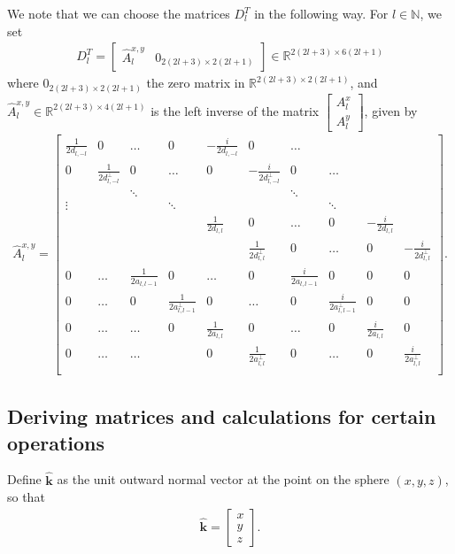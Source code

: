 \documentclass[11pt, oneside]{article}   	%
\newcommand{\R}{\mathbb{R}}
\newcommand{\N}{\mathbb{N}}
\newcommand{\Dlt}{D^T_l}
\newcommand{\unitvec}{\hat{\bm{k}}}
\begin{document}
We note that we can choose the matrices \(\Dlt\) in the following way. For \(l \in \N\), we set
\begin{align}
\Dlt = \begin{bmatrix}
		\hat{A}^{x,y}_l & 0_{2(2l+3)\times2(2l+1)}
	  \end{bmatrix} \in \R^{2(2l+3)\times6(2l+1)}
\end{align}
where \(0_{2(2l+3)\times2(2l+1)}\) the zero matrix in \(\R^{2(2l+3)\times2(2l+1)}\), and \(\hat{A}^{x,y}_l \in \R^{2(2l+3)\times4(2l+1)}\) is the left inverse of the matrix \(\begin{bmatrix} A^x_l \\ A^y_l \end{bmatrix}\), given by
\begin{align}
\hat{A}^{x,y}_l = \begin{bmatrix}
		\frac{1}{2d_{l,-l}} & 0 & \hdots & 0 & -\frac{i}{2d_{l,-l}} & 0 & \hdots &  \\
		0 & \frac{1}{2d^\perp_{l,-l}} & 0 & \hdots & 0 & -\frac{i}{2d^\perp_{l,-l}} & 0 & \hdots &  \\
		& & \ddots & & & & \ddots & & \\
		\vdots & & & \ddots & & & & \ddots & \\
		& & & & \frac{1}{2d_{l,l}} & 0 & \hdots & 0 & -\frac{i}{2d_{l,l}} & \\
		& & & & & \frac{1}{2d^\perp_{l,l}} & 0 & \hdots & 0 & -\frac{i}{2d^\perp_{l,l}} \\
		0 & \hdots & \frac{1}{2a_{l,l-1}} & 0 & \hdots & 0 & \frac{i}{2a_{l,l-1}} & 0 & 0 & 0 \\
		0 & \hdots & 0 & \frac{1}{2a^\perp_{l,l-1}} & 0 & \hdots & 0 & \frac{i}{2a^\perp_{l,l-1}} & 0 & 0\\
		0 & \hdots & \hdots & 0 & \frac{1}{2a_{l,l}} & 0 & \hdots & 0 & \frac{i}{2a_{l,l}} & 0 \\
		0 & \hdots & \hdots & & 0 & \frac{1}{2a^\perp_{l,l}} & 0 & \hdots & 0 & \frac{i}{2a^\perp_{l,l}} \\
	  \end{bmatrix}.
\end{align}



\subsection{Deriving matrices and calculations for certain operations}

Define \(\unitvec\) as the unit outward normal vector at the point on the sphere \((x,y,z)\), so that
\begin{align}
\unitvec = \begin{bmatrix} x \\ y \\ z \end{bmatrix}.
\end{align}
\end{document}
